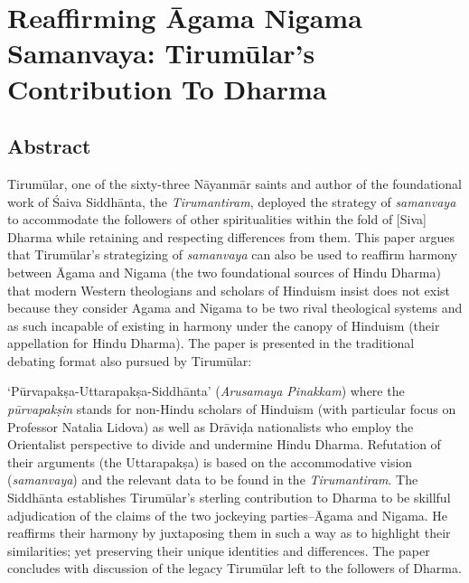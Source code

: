 
\chapter{Reaffirming Āgama Nigama Samanvaya: Tirumūlar’s Contribution To Dharma}



\section*{Abstract}

Tirumūlar, one of the sixty-three Nāyanmār saints and author of the foundational work of Śaiva Siddhānta, the \textit{Tirumantiram}, deployed the strategy of \textit{samanvaya} to accommodate the followers of other spiritualities within the fold of [Siva] Dharma while retaining and respecting differences from them. This paper argues that Tirumūlar’s strategizing of \textit{samanvaya} can also be used to reaffirm harmony between Āgama and Nigama (the two foundational sources of Hindu Dharma) that modern Western theologians and scholars of Hinduism insist does not exist because they consider Agama and Nigama to be two rival theological systems and as such incapable of existing in harmony under the canopy of Hinduism (their appellation for Hindu Dharma). The paper is presented in the traditional debating format also pursued by Tirumūlar:

‘Pūrvapakṣa-Uttarapakṣa-Siddhānta’ (\textit{Arusamaya Pinakkam}) where the \textit{pūrvapakṣin} stands for non-Hindu scholars of Hinduism (with particular focus on Professor Natalia Lidova) as well as Drāviḍa nationalists who employ the Orientalist perspective to divide and undermine Hindu Dharma. Refutation of their arguments (the Uttarapakṣa) is based on the accommodative vision (\textit{samanvaya}) and the relevant data to be found in the \textit{Tirumantiram}. The Siddhānta establishes Tirumūlar’s sterling contribution to Dharma to be skillful adjudication of the claims of the two jockeying parties--Āgama and Nigama. He reaffirms their harmony by juxtaposing them in such a way as to highlight their similarities; yet preserving their unique identities and differences. The paper concludes with discussion of the legacy Tirumūlar left to the followers of Dharma.



